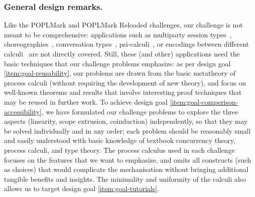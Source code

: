 \documentclass[runningheads]{llncs}
\begin{document}
\subsubsection{General design remarks.}
Like the POPLMark and POPLMark Reloaded challenges, our challenge is not meant to be comprehensive:
applications such as multiparty session types~\cite{10.1145/2827695,10.1145/3290343}, choreographies~\cite{DBLP:journals/jar/CruzFilipeMP23}, conversation types~\cite{DBLP:journals/tcs/CairesV10}, psi-calculi~\cite{lmcs:696}, or encodings between different calculi~\cite{DBLP:journals/iandc/Gorla10,DBLP:conf/forte/CairesP16,DBLP:journals/iandc/DardhaGS17,DBLP:conf/ecoop/ScalasDHY17,DBLP:journals/iandc/KouzapasPY19,10.1145/3479394.3479407} are not directly covered.  Still, these (and other) applications need the basic techniques that our challenge problems emphasize:
as per design goal \ref{item:goal-reusability},
our problems are drawn from the basic metatheory of process calculi (without requiring the development of new theory), and focus on well-known theorems
and results that involve interesting proof techniques that may be reused in further work.
To achieve design goal \ref{item:goal-comperison-accessibility},
we have formulated our challenge problems to explore the three aspects (linearity, scope extrusion, coinduction) independently, so that they may be solved individually and in any order;
each problem should be reasonably small and easily understood with basic knowledge of textbook concurrency theory, process calculi, and type theory.  The process calculus used in each challenge
focuses on the features that we want to emphasize, and omits all constructs
(such as choices) that would complicate the mechanisation without bringing additional tangible
benefits and insights. 
The minimality and uniformity of the calculi also allows us to target design
goal \ref{item:goal-tutorials}.


\end{document}
